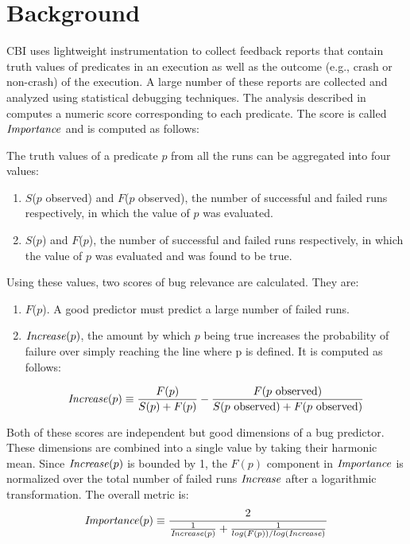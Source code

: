 
\section{Background}
\label{sec-bground}
CBI uses lightweight instrumentation to collect feedback reports that contain truth values of predicates in an execution as well as the outcome (e.g., crash or non-crash) of the execution.  A large number of these reports are collected and analyzed using statistical debugging techniques.  The analysis described in~\cite{Liblit:2005:SSBI} computes a numeric score corresponding to each predicate.  The score is called $\mathit{Importance}$ and is computed as follows:

The truth values of a predicate $p$ from all the runs can be aggregated into four values:

\begin{enumerate}
\item $S$($p$ observed) and $F$($p$ observed), the number of successful and failed runs respectively, in which the value of $p$ was evaluated.
\item $S$($p$) and $F$($p$), the number of successful and failed runs respectively, in which the value of $p$ was evaluated and was found to be true.
\end{enumerate}

Using these values, two scores of bug relevance are calculated.  They are:
\begin{enumerate}
\item $F$($p$).  A good predictor must predict a large number of failed runs.
\item $\mathit{Increase}(p)$, the amount by which $p$ being true increases the probability of failure over simply reaching the line where p is defined.  It is computed as follows:

\begin{equation}
\label{eqn1}
\mathit{Increase}(p) \equiv
\frac{F(p)}{S(p) + F(p)}
-
\frac{F(\text{$p$ observed})}{S(\text{$p$ observed}) +
  F(\text{$p$ observed})}
\end{equation}
\end{enumerate}

Both of these scores are independent but good dimensions of a bug predictor.  These dimensions are combined into a single value by taking their harmonic mean.  Since $\mathit{Increase}(p)$ is bounded by 1, the $F(p)$ component in $\mathit{Importance}$ is normalized over the total number of failed runs $\mathit{Increase}$ after a logarithmic transformation.  The overall metric is:
\begin{equation}
\label{eqn2}
\mathit{Importance}(p) \equiv
\frac{2}{
  \frac{1}{\mathit{Increase}(p)}
  +
  \frac{1}{log(F(p)) / log(\mathit{Increase})}}
\end{equation}

